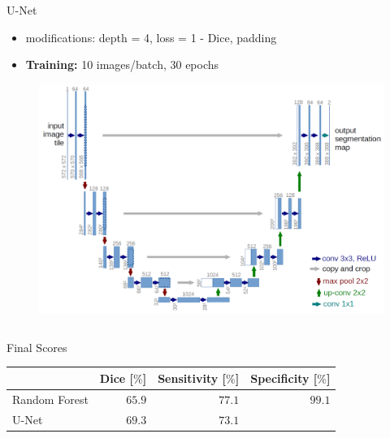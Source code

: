 \documentclass[final]{beamer}
\newlength{\onecolwid}
\newlength{\twocolwid}
\begin{document}
\begin{frame}[t]
\begin{columns}[t]
\begin{column}{\twocolwid}
\begin{columns}[t,totalwidth=\twocolwid]
\begin{column}{\onecolwid}
\begin{alertblock}{U-Net \cite{ronneberger2015u}}
\vspace*{12pt}
\begin{itemize}[label={}]
\item modifications: depth = 4, loss = 1 - Dice, padding
\item \textbf{Training:} 10 images/batch, 30 epochs
\end{itemize}
\begin{figure}
\centering
\includegraphics[width=0.9\linewidth]{u_net}
\end{figure}
\end{alertblock}

\end{column} %

\end{columns} %

\begin{alertblock}{Final Scores}
\centering
	\begin{tabular}{lrrr}
	\toprule
	 & Dice [$\%$] & Sensitivity [$\%$] & Specificity [$\%$] \\
	\midrule
	Random Forest & $65.9$ & $77.1$ & $99.1$ \\
	U-Net & $69.3$ & $73.1$ & \\
	\bottomrule
	\end{tabular}
\end{alertblock}



\end{column}
\end{columns}
\end{frame}
\end{document}
